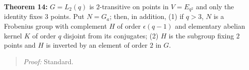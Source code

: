 {\bf Theorem 14:}
$G= L_2(q)$ is $2$-transitive on points in $V= E_{q^2}$ and only the identity fixes
$3$ points.  Put $N= G_a$; then, in addition,
(1) if $q>3$, $N$ is a Frobenius group with complement $H$ of order $\epsilon (q-1)$ and
elementary abelian kernel $K$ of order $q$ disjoint from its conjugates;
(2) $H$ is the subgroup fixing $2$ points and $H$ is inverted by an element of order $2$
in $G$.
\begin{quote}
\emph{Proof:}  
Standard.
\end{quote}
